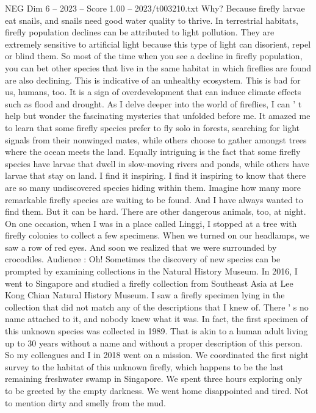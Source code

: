 \begin{textsample}{NEG Dim 6 – 2023 – Score 1.00 – 2023/t003210.txt}
Why?
Because firefly larvae eat snails, and snails need good water quality to thrive.
In terrestrial habitats, firefly population declines can be attributed to light pollution.
They are extremely sensitive to artificial light because this type of light can disorient, repel or blind them.
So most of the time when you see a decline in firefly population, you can bet other species that live in the same habitat in which fireflies are found are also declining.
This is indicative of an unhealthy ecosystem.
This is bad for us, humans, too.
It is a sign of overdevelopment that can induce climate effects such as flood and drought.
As I delve deeper into the world of fireflies, I can ' t help but wonder the fascinating mysteries that unfolded before me.
It amazed me to learn that some firefly species prefer to fly solo in forests, searching for light signals from their nonwinged mates, while others choose to gather amongst trees where the ocean meets the land.
Equally intriguing is the fact that some firefly species have larvae that dwell in slow-moving rivers and ponds, while others have larvae that stay on land.
I find it inspiring.
I find it inspiring to know that there are so many undiscovered species hiding within them.
Imagine how many more remarkable firefly species are waiting to be found.
And I have always wanted to find them.
But it can be hard.
There are other dangerous animals, too, at night.
On one occasion, when I was in a place called Linggi, I stopped at a tree with firefly colonies to collect a few specimens.
When we turned on our headlamps, we saw a row of red eyes.
And soon we realized that we were surrounded by crocodiles.
Audience : Oh!
Sometimes the discovery of new species can be prompted by examining collections in the Natural History Museum.
In 2016, I went to Singapore and studied a firefly collection from Southeast Asia at Lee Kong Chian Natural History Museum.
I saw a firefly specimen lying in the collection that did not match any of the descriptions that I knew of.
There ' s no name attached to it, and nobody knew what it was.
In fact, the first specimen of this unknown species was collected in 1989.
That is akin to a human adult living up to 30 years without a name and without a proper description of this person.
So my colleagues and I in 2018 went on a mission.
We coordinated the first night survey to the habitat of this unknown firefly, which happens to be the last remaining freshwater swamp in Singapore.
We spent three hours exploring only to be greeted by the empty darkness.
We went home disappointed and tired.
Not to mention dirty and smelly from the mud.

\end{textsample}
